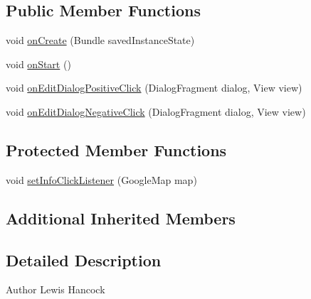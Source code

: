 \subsection*{Public Member Functions}
\begin{DoxyCompactItemize}
\item 
void \hyperlink{classuk_1_1ac_1_1swan_1_1digitaltrails_1_1fragments_1_1_edit_waypoint_map_fragment_a4611b7f39b7ad67461b7491c0db72af1}{on\+Create} (Bundle saved\+Instance\+State)
\item 
void \hyperlink{classuk_1_1ac_1_1swan_1_1digitaltrails_1_1fragments_1_1_edit_waypoint_map_fragment_a98b6b4265368d7bf79748f5c51614c4b}{on\+Start} ()
\item 
void \hyperlink{classuk_1_1ac_1_1swan_1_1digitaltrails_1_1fragments_1_1_edit_waypoint_map_fragment_a22db35994fe05c0010ff3a0a6a5bb0a2}{on\+Edit\+Dialog\+Positive\+Click} (Dialog\+Fragment dialog, View view)
\item 
void \hyperlink{classuk_1_1ac_1_1swan_1_1digitaltrails_1_1fragments_1_1_edit_waypoint_map_fragment_a6565a840b337650094b0d9e82f5f20d6}{on\+Edit\+Dialog\+Negative\+Click} (Dialog\+Fragment dialog, View view)
\end{DoxyCompactItemize}
\subsection*{Protected Member Functions}
\begin{DoxyCompactItemize}
\item 
void \hyperlink{classuk_1_1ac_1_1swan_1_1digitaltrails_1_1fragments_1_1_edit_waypoint_map_fragment_a048c0f0d6318c8399dd98cfa58e83fb6}{set\+Info\+Click\+Listener} (Google\+Map map)
\end{DoxyCompactItemize}
\subsection*{Additional Inherited Members}


\subsection{Detailed Description}
\begin{DoxyAuthor}{Author}
Lewis Hancock 
\end{DoxyAuthor}



